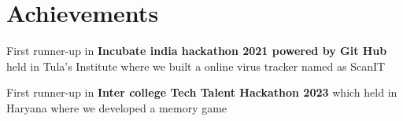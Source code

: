 \documentclass[letterpaper,10pt]{article}
\newcommand{\heading}[2]{
  \hspace{10pt}#1\hfill#2\\
}
\newcommand{\headingBf}[2]{
  \heading{\textbf{#1}}{\textbf{#2}}
}
\newenvironment{resume_list}{
  \vspace{-7pt}
  \begin{itemize}[itemsep=-2px, parsep=1pt, leftmargin=30pt]
}{
  \end{itemize}
}
\begin{document}
  \section{Achievements}


  \begin{resume_list}
  \vspace{5pt}
    \item First runner-up in \textbf{Incubate india hackathon 2021 powered by Git Hub} held in Tula's Institute where we built a online virus
tracker named as ScanIT
  \vspace{5pt}
    \item First runner-up in \textbf{Inter college Tech Talent Hackathon 2023} which held in Haryana where we developed a
memory game
  \end{resume_list}
\end{document}
